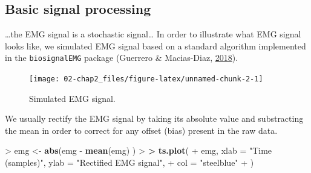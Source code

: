 \documentclass[a4paper,12pt,twoside,openright,oldfontcommands]{memoir}
\newenvironment{Shaded}{}{}
\newcommand{\KeywordTok}[1]{\textcolor[rgb]{0.00,0.44,0.13}{\textbf{#1}}}
\newcommand{\DataTypeTok}[1]{\textcolor[rgb]{0.56,0.13,0.00}{#1}}
\newcommand{\DecValTok}[1]{\textcolor[rgb]{0.25,0.63,0.44}{#1}}
\newcommand{\FloatTok}[1]{\textcolor[rgb]{0.25,0.63,0.44}{#1}}
\newcommand{\StringTok}[1]{\textcolor[rgb]{0.25,0.44,0.63}{#1}}
\newcommand{\OperatorTok}[1]{\textcolor[rgb]{0.40,0.40,0.40}{#1}}
\newcommand{\ErrorTok}[1]{\textcolor[rgb]{1.00,0.00,0.00}{\textbf{#1}}}
\newcommand{\NormalTok}[1]{#1}
\begin{document}
\subsection{Basic signal processing}\label{basic-signal-processing}

\ldots{}the EMG signal is a stochastic signal\ldots{} In order to
illustrate what EMG signal looks like, we simulated EMG signal based on
a standard algorithm implemented in the \texttt{biosignalEMG} package
(Guerrero \& Macias-Diaz, \protect\hyperlink{ref-R-biosignalEMG}{2018}).

\begin{Shaded}
\end{Shaded}

\begin{figure}[H]

{\centering \texttt{[image: 02-chap2\_files/figure-latex/unnamed-chunk-2-1]} 

}

\caption{Simulated EMG signal.}\label{fig:unnamed-chunk-2}
\end{figure}

We usually rectify the EMG signal by taking its absolute value and
substracting the mean in order to correct for any offset (bias) present
in the raw data.

\begin{Shaded}
\begin{Highlighting}[]
\OperatorTok{>}\StringTok{ }\NormalTok{emg <-}\StringTok{ }\KeywordTok{abs}\NormalTok{(emg }\OperatorTok{-}\StringTok{ }\KeywordTok{mean}\NormalTok{(emg) )}
\OperatorTok{>}\StringTok{ }
\ErrorTok{>}\StringTok{ }\KeywordTok{ts.plot}\NormalTok{(}
\OperatorTok{+}\StringTok{   }\NormalTok{emg, }\DataTypeTok{xlab =} \StringTok{"Time (samples)"}\NormalTok{, }\DataTypeTok{ylab =} \StringTok{"Rectified EMG signal"}\NormalTok{,}
\OperatorTok{+}\StringTok{   }\DataTypeTok{col =} \StringTok{"steelblue"}
\OperatorTok{+}\StringTok{   }\NormalTok{)}
\end{Highlighting}
\end{Shaded}
\end{document}

